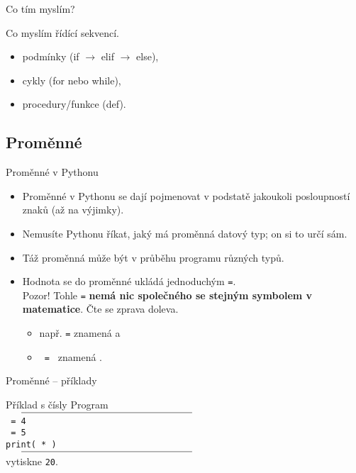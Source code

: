 \begin{frame}{Co tím myslím?}
 \begin{block}{Co myslím řídící sekvencí.}
  \begin{itemize}
   \item<1-> podmínky (\alert{if} $\rightarrow$ \alert{elif} $\rightarrow$
    \alert{else}),
   \item<2-> cykly (\alert{for} nebo \alert{while}),
   \item<3-> procedury/funkce (\alert{def}).
  \end{itemize}
 \end{block}
\end{frame}

\subsection[Proměnné]{Proměnné}

\begin{frame}{Proměnné v Pythonu}
 \begin{itemize}
  \item<1-> Proměnné v Pythonu se dají pojmenovat v podstatě jakoukoli
   posloupností znaků (až na výjimky).
  \item<2-> Nemusíte Pythonu říkat, jaký má proměnná datový typ; on si to určí
   sám.
  \item<3-> Táž proměnná může být v průběhu programu různých typů.
  \item<4-> Hodnota se do proměnné ukládá jednoduchým \texttt{=}.\\
   \alert{Pozor!} Tohle \texttt{=} \textbf{nemá nic společného se stejným
   symbolem v matematice}. Čte se \alert{zprava doleva}.
   \begin{itemize}
    \item např. \texttt{} \texttt{=} \texttt{} znamená  a
    \item \texttt{ = } znamená .
   \end{itemize}
 \end{itemize}
\end{frame}

\begin{frame}{Proměnné -- příklady}
 \begin{block}{Příklad s čísly}
  \vspace{6pt}
  Program\\
  $\vcenter{\rule{.5\textwidth}{0.4pt}}$\\
  \texttt{ = 4}\\
  \texttt{ = 5}\\
  \texttt{print( * )}\\
  $\vcenter{\rule{.5\textwidth}{0.4pt}}$\\
  vytiskne \texttt{20}.
 \end{block}
\end{frame}

